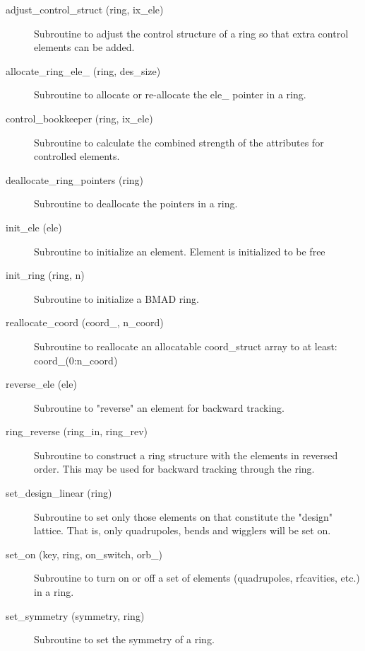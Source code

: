 \begin{description}

\item[adjust\_control\_struct (ring, ix\_ele)] \Newline
Subroutine to adjust the control structure of a ring so that 
extra control elements can be added. 

\item[allocate\_ring\_ele\_ (ring, des\_size)] \Newline 
     Subroutine to allocate or re-allocate the ele\_ pointer in a ring.

\item[control\_bookkeeper (ring, ix\_ele)] \Newline
Subroutine to calculate the combined strength of the attributes for controlled elements. 

\item[deallocate\_ring\_pointers (ring)] \Newline 
     Subroutine to deallocate the pointers in a ring.

\item[init\_ele (ele)] \Newline
Subroutine to initialize an element. Element is initialized to be free 

\item[init\_ring (ring, n)] \Newline 
     Subroutine to initialize a BMAD ring.

\item[reallocate\_coord (coord\_, n\_coord)] \Newline 
     Subroutine to reallocate an allocatable  coord\_struct array to at least:
         coord\_(0:n\_coord)

\item[reverse\_ele (ele)] \Newline
Subroutine to "reverse" an element for backward tracking. 

\item[ring\_reverse (ring\_in, ring\_rev)] \Newline
Subroutine to construct a ring structure with the elements in reversed 
order. This may be used for backward tracking through the ring. 

\item[set\_design\_linear (ring)] \Newline
Subroutine to set only those elements on that constitute the "design" 
lattice. That is, only quadrupoles, bends and wigglers will be set on. 

\item[set\_on (key, ring, on\_switch, orb\_)] \Newline
Subroutine to turn on or off a set of elements (quadrupoles, rfcavities, etc.) in a ring. 

\item[set\_symmetry (symmetry, ring)] \Newline
Subroutine to set the symmetry of a ring. 


\end{description}

